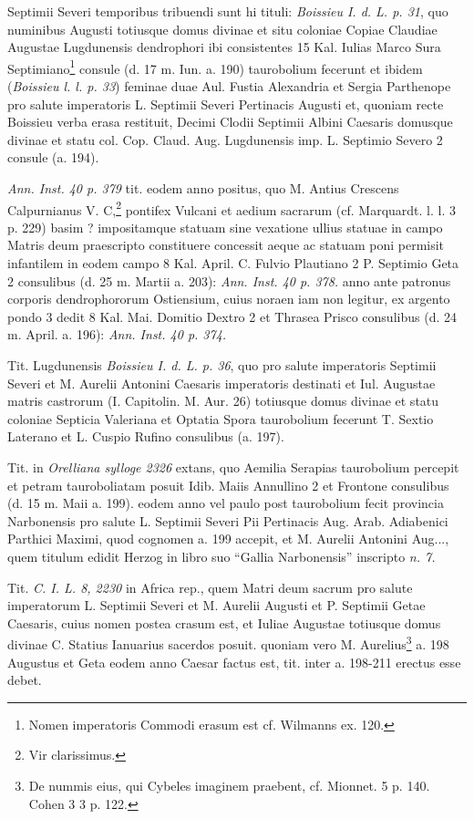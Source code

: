 \documentclass[a4paper, 11pt, oneside, polutonikogreek, german]{article}
\begin{document}
Septimii Severi temporibus tribuendi sunt hi tituli: \emph{Boissieu I. d. L. p. 31}, quo numinibus Augusti totiusque domus divinae et situ coloniae Copiae Claudiae Augustae Lugdunensis dendrophori ibi consistentes 15 Kal. Iulias Marco Sura Septimiano\footnote{Nomen imperatoris Commodi erasum est cf. Wilmanns ex. 120.} consule (d. 17 m. Iun. a. 190) taurobolium fecerunt et ibidem (\emph{Boissieu l. l. p. 33}) feminae duae Aul. Fustia Alexandria et Sergia Parthenope pro salute imperatoris L. Septimii Severi Pertinacis Augusti et, quoniam recte Boissieu verba erasa restituit, Decimi Clodii Septimii Albini Caesaris domusque divinae et statu col. Cop. Claud. Aug. Lugdunensis imp. L. Septimio Severo 2 consule (a. 194).

\emph{Ann. Inst. 40 p. 379} tit. eodem anno positus, quo M. Antius Crescens Calpurnianus V. C,\footnote{Vir clarissimus.} pontifex Vulcani et aedium sacrarum (cf. Marquardt. l. l. 3 p. 229) basim ? impositamque statuam sine vexatione ullius statuae in campo Matris deum praescripto constituere concessit aeque ac statuam poni permisit infantilem in eodem campo 8 Kal. April. C. Fulvio Plautiano 2 P. Septimio Geta 2 consulibus (d. 25 m. Martii a. 203): \emph{Ann. Inst. 40 p. 378.} anno ante patronus corporis dendrophororum Ostiensium, cuius noraen iam non legitur, ex argento pondo 3 dedit 8 Kal. Mai. Domitio Dextro 2 et Thrasea Prisco consulibus (d. 24 m. April. a. 196): \emph{Ann. Inst. 40 p. 374.}

Tit. Lugdunensis \emph{Boissieu I. d. L. p. 36}, quo pro salute imperatoris Septimii Severi et M. Aurelii Antonini Caesaris imperatoris destinati et Iul. Augustae matris castrorum (I. Capitolin. M. Aur. 26) totiusque domus divinae et statu coloniae Septicia Valeriana et Optatia Spora taurobolium fecerunt T. Sextio Laterano et L. Cuspio Rufino consulibus (a. 197).

Tit. in \emph{Orelliana sylloge 2326} extans, quo Aemilia Serapias taurobolium percepit et petram tauroboliatam posuit Idib. Maiis Annullino 2 et Frontone consulibus (d. 15 m. Maii a. 199). eodem anno vel paulo post taurobolium fecit provincia Narbonensis pro salute L. Septimii Severi Pii Pertinacis Aug. Arab. Adiabenici Parthici Maximi, quod cognomen a. 199 accepit, et M. Aurelii Antonini Aug..., quem titulum edidit Herzog in libro suo "`Gallia Narbonensis"' inscripto \emph{n. 7.}

Tit. \emph{C. I. L. 8, 2230} in Africa rep., quem Matri deum sacrum pro salute imperatorum L. Septimii Severi et M. Aurelii Augusti et P. Septimii Getae Caesaris, cuius nomen postea crasum est, et Iuliae Augustae totiusque domus divinae C. Statius Ianuarius sacerdos posuit. quoniam vero M. Aurelius\footnote{De nummis eius, qui Cybeles imaginem praebent, cf. Mionnet. 5 p. 140. Cohen 3 3 p. 122.} a. 198 Augustus et Geta eodem anno Caesar factus est, tit. inter a. 198-211 erectus esse debet.
\end{document}
